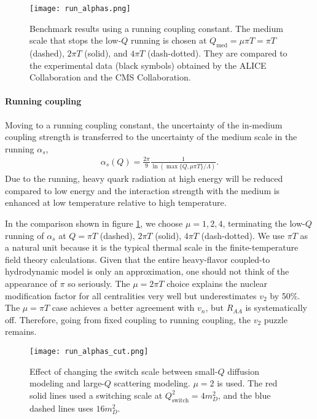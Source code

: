 \begin{figure}
\singlespacing
\centering
\texttt{[image: run\_alphas.png]}
\caption[Benchmark results using a running coupling constant. The]{Benchmark results using a running coupling constant. The medium scale that stops the low-$Q$ running is chosen at $Q_{\textrm{med}} = \mu\pi T = \pi T$ (dashed), $2\pi T$ (solid), and $4\pi T$ (dash-dotted). They are compared to the experimental data (black symbols) obtained by the ALICE Collaboration and the CMS Collaboration.}
\label{fig:new:run-a}
\end{figure}

\paragraph{Running coupling} Moving to a running coupling constant, the uncertainty of the in-medium coupling strength is transferred to the uncertainty of the medium scale in the running $\alpha_s$,
\begin{eqnarray}
\alpha_s(Q) = \frac{2\pi}{9}\frac{1}{\ln \left( \max\{Q, \mu\pi T\} / \Lambda\right)}.
\end{eqnarray}
Due to the running, heavy quark radiation at high energy will be reduced compared to low energy and the interaction strength with the medium is enhanced at low temperature relative to high temperature.

In the comparison shown in figure \ref{fig:new:run-a}, we choose $\mu = 1, 2, 4$, terminating the low-$Q$ running of $\alpha_s$ at $Q = \pi T$ (dashed), $2\pi T$ (solid), $4\pi T$ (dash-dotted).
We use $\pi T$ as a natural unit because it is the typical thermal scale in the finite-temperature field theory calculations.
Given that the entire heavy-flavor coupled-to hydrodynamic model is only an approximation, one should not think of the appearance of $\pi$ so seriously.
The $\mu=2\pi T$ choice explains the nuclear modification factor for all centralities very well but underestimates $v_2$ by 50\%.
The $\mu=\pi T$ case achieves a better agreement with $v_n$, but $R_{AA}$ is systematically off.
Therefore, going from fixed coupling to running coupling, the $v_2$ puzzle remains.

\begin{figure}
\singlespacing
\centering
\texttt{[image: run\_alphas\_cut.png]}
\caption[Effect of changing the switch scale between small-$Q$ diffusion]{Effect of changing the switch scale between small-$Q$ diffusion modeling and large-$Q$ scattering modeling. $\mu=2$ is used. The red solid lines used a switching scale at $Q_{\textrm{switch}}^2 = 4 m_D^2$, and the blue dashed lines uses $16 m_D^2$.}
\label{fig:new:run-cut}
\end{figure}
